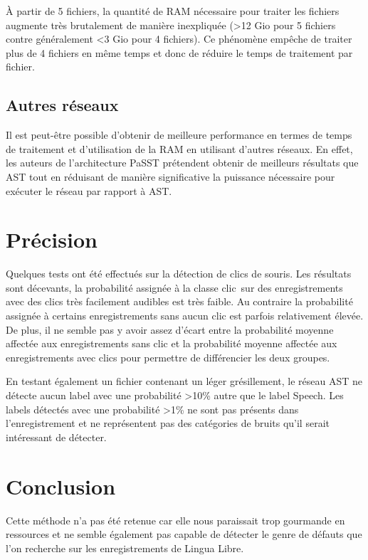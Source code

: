 \documentclass{article}
\begin{document}
À partir de 5 fichiers, la quantité de RAM nécessaire pour traiter les fichiers augmente très brutalement de manière inexpliquée (>12 Gio pour 5 fichiers contre généralement <3 Gio pour 4 fichiers). Ce phénomène empêche de traiter plus de 4 fichiers en même temps et donc de réduire le temps de traitement par fichier.

\subsection{Autres réseaux}

Il est peut-être possible d’obtenir de meilleure performance en termes de temps de traitement et d’utilisation de la RAM en utilisant d’autres réseaux. En effet, les auteurs de l’architecture PaSST prétendent obtenir de meilleurs résultats que AST tout en réduisant de manière significative la puissance nécessaire pour exécuter le réseau par rapport à AST.

\section{Précision}

Quelques tests ont été effectués sur la détection de clics de souris. Les résultats sont décevants, la probabilité assignée à la classe \og clic\fg\ sur des enregistrements avec des clics très facilement audibles est très faible. Au contraire la probabilité assignée à certains enregistrements sans aucun clic est parfois relativement élevée. De plus, il ne semble pas y avoir assez d’écart entre la probabilité moyenne affectée aux enregistrements sans clic et la probabilité moyenne affectée aux enregistrements avec clics pour permettre de différencier les deux groupes.

En testant également un fichier contenant un léger grésillement, le réseau AST ne détecte aucun label avec une probabilité >10\% autre que le label \og Speech\fg. Les labels détectés avec une probabilité >1\% ne sont pas présents dans l’enregistrement et ne représentent pas des catégories de bruits qu’il serait intéressant de détecter.

\section{Conclusion}

Cette méthode n'a pas été retenue car elle nous paraissait trop gourmande en ressources et ne semble également pas capable de détecter le genre de défauts que l'on recherche sur les enregistrements de Lingua Libre.
\end{document}
